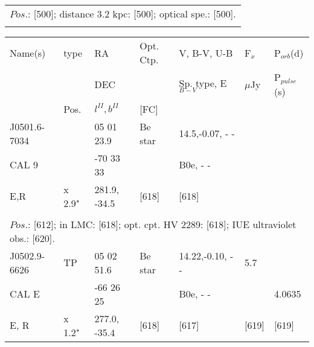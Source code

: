 \documentclass{aa}
\begin{document}
\begin{table*}[h]
\begin{tabular}{p{2.5cm}p{1cm}p{1.8cm}p{2.3cm}p{3.3cm}p{2.0cm}p{2.2cm}}
\\
\multicolumn{7}{p{17.5cm}}{
$Pos$.: [500]; distance 3.2 kpc: [500]; optical spe.: [500].   }\\
  
\noalign{\smallskip}
\hline
\end{tabular}
\end{table*}

\clearpage\begin{table*}[h]
\begin{tabular}{p{2.5cm}p{1cm}p{1.8cm}p{2.3cm}p{3.3cm}p{2.0cm}p{2.2cm}}
\noalign{\smallskip}
\multicolumn{7}{p{17.5cm}}{Table 1.  (continued) }\\        
\hline
\noalign{\smallskip}
Name(s)      & type  & RA                       &  Opt. Ctp. & V, B-V, U-B                    &   F$_{x}$           & P$_{orb}$(d)    \\
                      &            &  DEC                   &                     &  Sp. type, E$_{B-V}$  &    $\mu$Jy         & P$_{pulse}$(s) \\
                      & Pos.  &  $l^{II}, b^{II}$     &  [FC]           &                                          &                            &                             \\
\noalign{\smallskip} 

\hline
\noalign{\smallskip}
J0501.6-7034   &              &  05 01 23.9    &  Be star      &      14.5,-0.07, - -      &            &           \\
CAL 9                &              &     -70 33 33   &                       &    B0e, - -                  &            &            \\            
 E,R                    &  x 2.9" & 281.9, -34.5   &    [618]           &     [618]                    &            &        \\
  
\\
\multicolumn{7}{p{17.5cm}}{
$Pos$.: [612]; in LMC: [618]; opt. cpt. HV 2289: [618]; IUE ultraviolet obs.: [620].    }\\

\noalign{\smallskip}
\hline
\noalign{\smallskip}
J0502.9-6626  &   TP       &   05 02 51.6 & Be star     & 14.22,-0.10, - -         &  5.7         &                    \\
  CAL E            &                &  -66 26 25    &                     &  B0e, - -                   &                   &  4.0635     \\
E, R                   &  x 1.2"   & 277.0, -35.4 & [618]           &      [617]                 &  [619]         &  [619]            \\
  

\end{tabular}
\end{table*}
\end{document}
